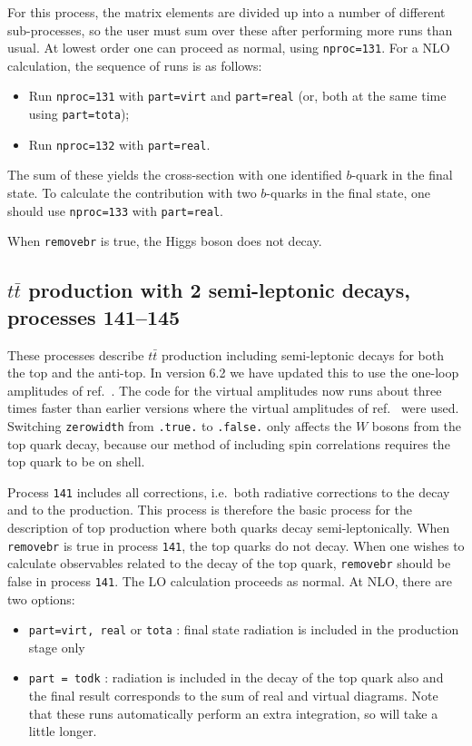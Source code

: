 \documentclass[12pt]{article}
\begin{document}
For this process, the matrix elements are divided up into a number of
different sub-processes, so the user must sum over these after performing
more runs than usual. At lowest order one can proceed as normal, using
{\tt nproc=131}. For a NLO calculation, the sequence of runs is as follows:
\begin{itemize}
\item Run {\tt nproc=131} with {\tt part=virt} and {\tt part=real} (or, both
at the same time using {\tt part=tota});
\item Run {\tt nproc=132} with {\tt part=real}.
\end{itemize}
The sum of these yields the cross-section with one identified $b$-quark in
the final state. To calculate the contribution with two $b$-quarks in the
final state, one should use {\tt nproc=133} with {\tt part=real}.

When {\tt removebr} is true, the Higgs boson does not decay.

\subsection{$t\bar{t}$ production with 2 semi-leptonic decays, processes 141--145}

These processes describe $t \bar{t}$ production including semi-leptonic
decays for both the top and the anti-top. 
In version 6.2 we have updated this to use the one-loop amplitudes of
ref.~\cite{Badger:2011yu}. The code for the virtual amplitudes now runs
about three times faster than earlier versions where the virtual
amplitudes of ref.~\cite{Korner:2002hy} were used.  
Switching {\tt zerowidth} from {\tt .true.} to {\tt .false.} only affects 
the $W$ bosons from the top quark decay, because our method of including spin
correlations requires the top quark to be on shell.

Process {\tt 141} includes all corrections, i.e.\ both radiative corrections
to the decay and to the production. This process is therefore the
basic process for the description of top production where both quarks
decay semi-leptonically.  When {\tt removebr} is true in process {\tt 141},
the top quarks do not decay.
When one wishes to calculate observables related to the decay of the top
quark, {\tt removebr} should be false in process {\tt 141}.
The LO calculation proceeds as normal. At NLO, there are two options:
\begin{itemize}
\item {\tt part=virt, real} or {\tt tota} : final state radiation is included
in the production stage only
\item {\tt part = todk} : radiation is included in the decay of the top
quark also and the final result corresponds to the sum of real and virtual
diagrams. 
Note that these runs automatically perform an extra integration, so
will take a little longer.
\end{itemize}
\end{document}
